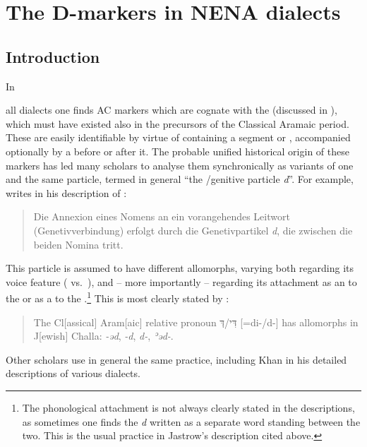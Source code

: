 

\chapter{The D-markers in NENA dialects} \label{ch:synchrony}









\section{Introduction}
In

all  dialects one finds AC markers which are cognate with the \Syr \lnk* {} (discussed in ), which must have existed also in the  precursors of the Classical Aramaic period. These are easily identifiable by virtue of containing a segment  or , accompanied optionally by a  before or after it. The probable unified historical origin of these markers has led many scholars to analyse them synchronically as variants of one and the same particle, termed in general \enquote{the /genitive particle \textit{d}}. For example, \citet[25]{JastrowHertevin} writes in his description of \Her: \blockquote{Die Annexion eines Nomens an ein vorangehendes Leitwort (Genetivverbindung) erfolgt durch die Genetivpartikel \textit{d}, die zwischen die beiden Nomina tritt.} This particle is assumed to have different allomorphs, varying both regarding its voice feature ( vs.\ ), and -- more importantly -- regarding its attachment as an  to the \prim or as a  to the \secn.\footnote{The phonological attachment is not always clearly stated in the descriptions, as sometimes one finds the \textit{d} written as a separate word standing between the two. This is the usual practice in Jastrow's description cited above.} This is most clearly stated by \citet[44]{FassbergChalla}: \blockquote{The Cl[assical] Aram[aic] relative pronoun \texthebrew{דִּי/דְּ} [=di-/d-] has allomorphs in J[ewish] Challa: \textit{-əd}, \textit{-d}, \textit{d-}, \textit{ʾəd-}.} Other scholars use in general the same practice, including Khan in his detailed descriptions of various  dialects.  

